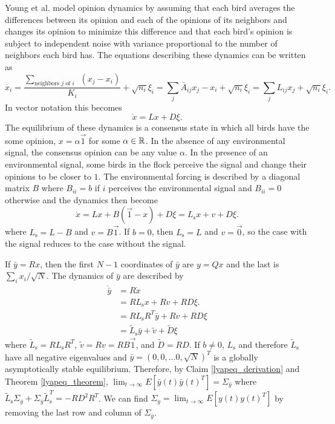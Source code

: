 \documentclass{article}
\begin{document}
Young et al. \cite{Young:2010fk} model opinion dynamics by assuming that each bird averages the differences between its opinion and each of the opinions of its neighbors and changes its opinion to minimize this difference and that each bird's opinion is subject to independent noise with variance proportional to the number of neighbors each bird has. The equations describing these dynamics can be written as 
\begin{equation}
\dot{x_i}=\frac{\sum_{\text{neighbors $j$ of $i$ } }(x_j-x_i)}{K_i} +\sqrt{n_i}\xi_i=\sum_j\bar{A}_{ij}x_j-x_i+\sqrt{n_i}\xi_i=\sum_jL_{ij}x_j+\sqrt{n_i}\xi_i.
\end{equation}
In vector notation this becomes
\begin{equation}
\dot{x}=Lx+D\xi.
\end{equation}
The equilibrium of these dynamics is a consensus state in which all birds have the some opinion, $x=\alpha\vec{1}$ for some $\alpha\in{\mathbb{R}}$. In the absence of any environmental signal, the consensus opinion can be any value $\alpha$. In the presence of an environmental signal, some birds in the flock perceive the signal and change their opinions to be closer to $1$. The environmental forcing is described by a diagonal matrix $B$ where $B_{ii}=b$ if $i$ perceives the environmental signal and $B_{ii}=0$ otherwise and the dynamics then become
\begin{equation}
\dot{x}=Lx+B(\vec{1}-x)+D\xi=L_\text{s}x+v+D\xi.
\end{equation}
where $L_\text{s}=L-B$ and $v=B\vec{1}$. If $b=0$, then $L_\text{s}=L$ and $v=\vec{0}$, so the case with the signal reduces to the case without the signal. 


If $\bar{y}=Rx$, then the first $N-1$ coordinates of $\bar{y}$ are $y=Qx$ and the last is $\sum_ix_i/\sqrt{N}$. The dynamics of $\bar{y}$ are described by 
\begin{align*}
\dot{\bar{y}}&=R\dot{x}
\\&=RL_\text{s}x+Rv+RD\xi.
\\&=RL_\text{s}R^T\bar{y}+Rv+RD\xi
\\&=\tilde{L}_\text{s}\bar{y}+\tilde{v}+\tilde{D}\xi 
\end{align*}
where $\tilde{L}_\text{s}=RL_\text{s}R^T$, $\tilde{v}=Rv=RB\vec{1}$, and $\tilde{D}=RD$. If $b\neq 0$, $L_\text{s}$ and therefore $\tilde{L}_\text{s}$ have all negative eigenvalues and $\bar{y}=(0, 0, \dots 0, \sqrt{N})^T$ is a globally asymptotically stable equilibrium. Therefore, by Claim \ref{lyapeq_derivation} and Theorem \ref{lyapeq_theorem}, $\lim_{t\to\infty}E[\bar{y}(t)\bar{y}(t)^T]=\Sigma_{\bar{y}}$ where $\tilde{L}_\text{s}\Sigma_{\bar{y}}+\Sigma_{\bar{y}}\tilde{L}_\text{s}^T=-RD^2R^T$. We can  find $\Sigma_y=\lim_{t\to\infty}E[y(t)y(t)^T]$
by removing the last row and column of $\Sigma_{\bar{y}}$.
\end{document}
